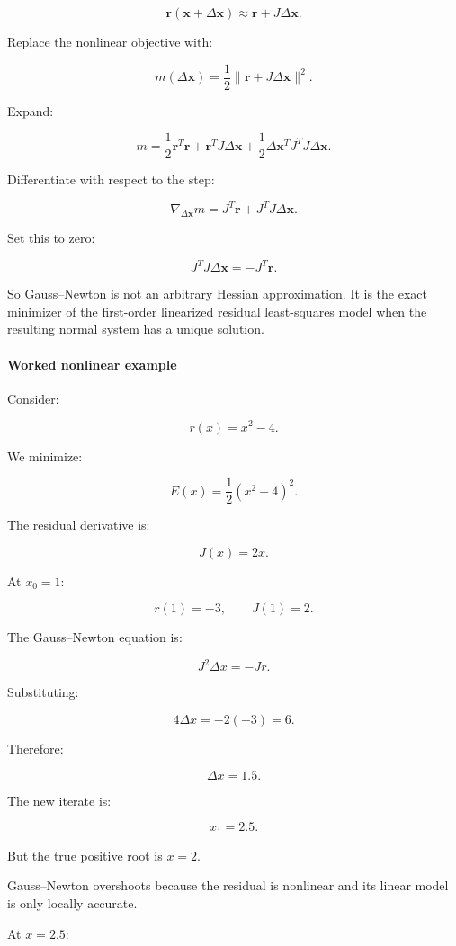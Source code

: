 \[
\mathbf r(\mathbf x+\Delta\mathbf x) \approx \mathbf r+J\Delta\mathbf x.
\]

Replace the nonlinear objective with:

\[
m(\Delta\mathbf x) = \frac12\|\mathbf r+J\Delta\mathbf x\|^2.
\]

Expand:

\[
m= \frac12\mathbf r^T\mathbf r +\mathbf r^TJ\Delta\mathbf x +\frac12\Delta\mathbf x^TJ^TJ\Delta\mathbf x.
\]

Differentiate with respect to the step:

\[
\nabla_{\Delta\mathbf x}m = J^T\mathbf r+J^TJ\Delta\mathbf x.
\]

Set this to zero:

\[
\boxed{ J^TJ\Delta\mathbf x=-J^T\mathbf r }.
\]

So Gauss--Newton is not an arbitrary Hessian approximation. It is the exact minimizer of the first-order linearized residual least-squares model when the resulting normal system has a unique solution.

\paragraph{Worked nonlinear example}\label{02-foundations-ii-ch027-worked-nonlinear-example}

Consider:

\[
r(x)=x^2-4.
\]

We minimize:

\[
E(x)=\frac12(x^2-4)^2.
\]

The residual derivative is:

\[
J(x)=2x.
\]

At \(x_0=1\):

\[
r(1)=-3,\qquad J(1)=2.
\]

The Gauss--Newton equation is:

\[
J^2\Delta x=-Jr.
\]

Substituting:

\[
4\Delta x=-2(-3)=6.
\]

Therefore:

\[
\boxed{\Delta x=1.5}.
\]

The new iterate is:

\[
x_1=2.5.
\]

But the true positive root is \(x=2\).

Gauss--Newton overshoots because the residual is nonlinear and its linear model is only locally accurate.

At \(x=2.5\):

